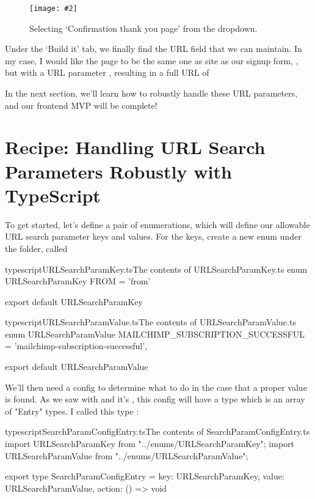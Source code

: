 \documentclass[paper=6in:9in,pagesize=pdftex,headinclude=on,footinclude=on,12pt,twoside]{scrbook}
\newcommand{\standardfigure}[3]{\begin{figure}[H]\begin{center}\texttt{[image: \#2]}\caption{#3}\label{fig:#2}\end{center}\end{figure}}
\begin{document}
\standardfigure{\textwidth}{frontend/mailchimp/confirmation-page-dropdown}{Selecting `Confirmation thank you page' from the dropdown.}

Under the `Build it' tab, we finally find the URL field that we can maintain. In my case, I would like the page to be the same one as site as our signup form, , but with a URL parameter , resulting in a full URL of 

In the next section, we'll learn how to robustly handle these URL parameters, and our frontend MVP will be complete!

\section{Recipe: Handling URL Search Parameters Robustly with TypeScript}

To get started, let's define a pair of enumerations, which will define our allowable URL search parameter keys and values. For the keys, create a new enum under the  folder, called 

\begin{codeInput}{typescript}{URLSearchParamKey.ts}{The contents of URLSearchParamKey.ts}
enum URLSearchParamKey {
  FROM = 'from'
}

export default URLSearchParamKey
\end{codeInput}

\begin{codeInput}{typescript}{URLSearchParamValue.ts}{The contents of URLSearchParamValue.ts}
enum URLSearchParamValue {
  MAILCHIMP_SUBSCRIPTION_SUCCESSFUL = 'mailchimp-subscription-successful',
}

export default URLSearchParamValue  
\end{codeInput}

We'll then need a config to determine what to do in the case that a proper value is found. As we saw with  and it's , this config will have a type which is an array of "Entry" types. I called this  type :

\begin{codeInput}{typescript}{SearchParamConfigEntry.ts}{The contents of SearchParamConfigEntry.ts}
import URLSearchParamKey from "../enums/URLSearchParamKey";
import URLSearchParamValue from "../enums/URLSearchParamValue";

export type SearchParamConfigEntry = {
    key: URLSearchParamKey,
    value: URLSearchParamValue,
    action: () => void
}
\end{codeInput}
\end{document}
